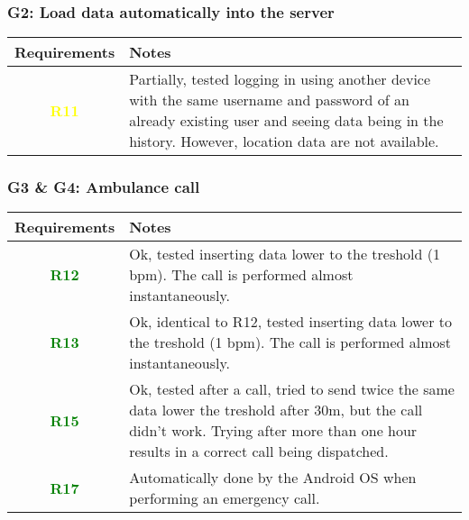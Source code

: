\subsubsection{G2: Load data automatically into the server}
  \begin{adjustwidth}{1cm}{}
        \begin{longtable}{|c|p{}|}
            \hline
            \textbf{Requirements} & \textbf{Notes} \\
            \hline
            \textbf{\textcolor{yellow}{R11}} & Partially, tested logging in using another device with the same username and password of an already existing user and seeing data being in the history. However, location data are not available. \\
            \hline
            
            
        \end{longtable}
    \end{adjustwidth}
    
\subsubsection{G3 \& G4: Ambulance call}
  \begin{adjustwidth}{1cm}{}
        \begin{longtable}{|c|p{}|}
            \hline
            \textbf{Requirements} & \textbf{Notes} \\
            \hline
            \textbf{\textcolor{green}{R12}} & Ok, tested inserting data lower to the treshold (1 bpm). The call is performed almost instantaneously.  \\
            \hline
            \textbf{\textcolor{green}{R13}} & Ok, identical to R12, tested inserting data lower to the treshold (1 bpm). The call is performed almost instantaneously.  \\
            \hline
            \textbf{\textcolor{green}{R15}} & Ok, tested after a call, tried to send twice the same data lower the treshold after 30m, but the call didn't work. Trying after more than one hour results in a correct call being dispatched.  \\
            \hline
            \textbf{\textcolor{green}{R17}} & Automatically done by the Android OS when performing an emergency call.  \\
            \hline            
            
        \end{longtable}
    \end{adjustwidth}
    
